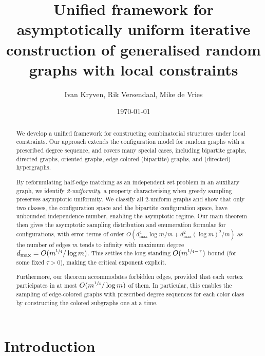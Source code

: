\documentclass{article}
\title{Unified framework for asymptotically uniform iterative construction of generalised random graphs with  local constraints}
\author{Ivan Kryven, Rik Versendaal, Mike de Vries}
\date{\today}
\theoremstyle{plain}
\theoremstyle{remark}
\theoremstyle{plain}
\numberwithin{equation}{section}
\begin{document}
	
	
	\maketitle
	
	
	\begin{abstract}
		We develop a unified framework for constructing combinatorial structures under local constraints. Our approach extends the configuration model for random graphs with a prescribed degree sequence, and covers many special cases, including bipartite graphs, directed graphs, oriented graphs, edge-colored (bipartite) graphs, and (directed) hypergraphs.
		
		By reformulating half-edge matching as an independent set problem in an auxiliary graph, we identify \emph{2-uniformity}, a property characterising when greedy sampling preserves asymptotic uniformity. We classify all 2-uniform graphs and show that only two classes, the configuration space and the bipartite configuration space, have unbounded independence number, enabling the asymptotic regime. Our main theorem then gives the asymptotic sampling distribution and enumeration formulae for configurations, with error terms of order $O(d_{\max}^4\log m/m+d_{\max}^2(\log m)^2/m)$ as the number of edges $m$ tends to infinity with maximum degree $d_{\max}=O(m^{\sfrac14}/\log m)$. This settles the long-standing $O(m^{\sfrac14-\tau})$ bound (for some fixed $\tau > 0$), making the critical exponent explicit.
		
		Furthermore, our theorem accommodates forbidden edges, provided that each vertex participates in at most $O(m^{\sfrac14}/\log m)$ of them. In particular, this enables the sampling of edge-colored graphs with prescribed degree sequences for each color class by constructing the colored subgraphs one at a time.
	\end{abstract}
	
	
	\tableofcontents
	
	
	\section{Introduction}\label{section_introduction}
	
\end{document}
